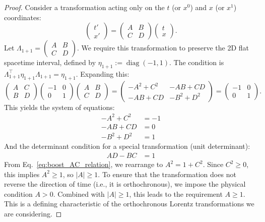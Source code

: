 \documentclass{amsart}
\theoremstyle{definition}
\theoremstyle{remark}
\DeclareMathOperator{\diag}{diag}
\begin{document}
\begin{proof}
  Consider a transformation acting only on the $t$ (or $x^0$) and $x$ (or $x^1$) coordinates:
  \[
  \begin{pmatrix} t' \\ x' \end{pmatrix} = \begin{pmatrix} A & B \\ C & D \end{pmatrix} \begin{pmatrix} t \\ x \end{pmatrix}.
  \]
  Let $\Lambda_{1+1} = \begin{pmatrix} A & B \\ C & D \end{pmatrix}$. We require this transformation to preserve the 2D flat spacetime interval, defined by $\eta_{1+1} := \diag(-1, 1)$. The condition is $\Lambda_{1+1}^\top \eta_{1+1} \Lambda_{1+1} = \eta_{1+1}$.
  Expanding this:
  \[
  \begin{pmatrix} A & C \\ B & D \end{pmatrix}
  \begin{pmatrix} -1 & 0 \\ 0 & 1 \end{pmatrix}
  \begin{pmatrix} A & B \\ C & D \end{pmatrix}
  =
  \begin{pmatrix} -A^2 + C^2 & -AB + CD \\ -AB + CD & -B^2 + D^2 \end{pmatrix}
  =
  \begin{pmatrix} -1 & 0 \\ 0 & 1 \end{pmatrix}.
  \]
  This yields the system of equations:
  \begin{align}
    -A^2 + C^2 &= -1 \label{eq:boost_AC_relation} \\ 
    -AB + CD &= 0 \label{eq:boost_ABCD_relation} \\ 
    -B^2 + D^2 &= 1 \label{eq:boost_BD_relation}
  \end{align}
  And the determinant condition for a special transformation (unit determinant):
  \begin{align}
    AD-BC &= 1 \label{eq:boost_determinant}
  \end{align}
  From Eq.~\eqref{eq:boost_AC_relation}, we rearrange to $A^2 = 1 + C^2$. Since $C^2 \geq 0$, this implies $A^2 \geq 1$, so $|A| \geq 1$.
  To ensure that the transformation does not reverse the direction of time (i.e., it is orthochronous), we impose the physical condition $A > 0$. Combined with $|A| \geq 1$, this leads to the requirement $A \geq 1$. This is a defining characteristic of the orthochronous Lorentz transformations we are considering.


\end{proof}
\end{document}
